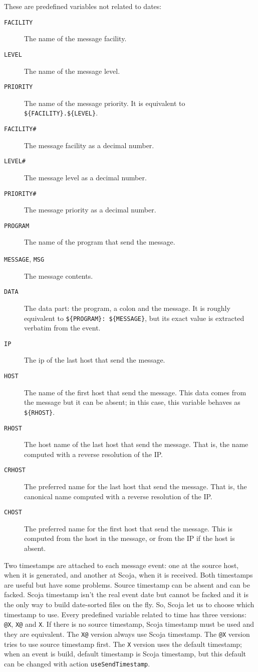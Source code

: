 These are predefined variables not related to dates:
\begin{description}
  \item[{\tt FACILITY}]
    The name of the message facility.
  \item[{\tt LEVEL}]
    The name of the message level.
  \item[{\tt PRIORITY}]
    The name of the message priority.
    It is equivalent to \verb|${FACILITY}.${LEVEL}|.
  \item[{\tt FACILITY\#}]
    The message facility as a decimal number.
  \item[{\tt LEVEL\#}]
    The message level as a decimal number.
  \item[{\tt PRIORITY\#}]
    The message priority as a decimal number.
  
  \item[{\tt PROGRAM}]
    The name of the program that send the message.
  \item[{\tt MESSAGE}, {\tt MSG}]
    The message contents.
  \item[{\tt DATA}]
    The data part: the program, a colon and the message.
    It is roughly equivalent to \verb|${PROGRAM}: ${MESSAGE}|,
    but its exact value is extracted verbatim from the event.
    
  \item[{\tt IP}]
    The ip of the last host that send the message.
  \item[{\tt HOST}]
    The name of the first host that send the message.
    This data comes from the message but it can be absent;
    in this case, this variable behaves as \verb|${RHOST}|.
  \item[{\tt RHOST}]
    The host name of the last host that send the message.
    That is, the name computed with a reverse resolution of the IP.
  \item[{\tt CRHOST}]
    The preferred name for the last host that send the message.
    That is, the canonical name computed with a reverse resolution of the IP.
  \item[{\tt CHOST}]
    The preferred name for the first host that send the message.
    This is computed from the host in the message, or from the IP if
    the host is absent.
\end{description}

Two timestamps are attached to each message event:
one at the source host, when it is generated,
and another at Scoja, when it is received.
Both timestamps are useful but have some problems.
Source timestamp can be absent and can be facked.
Scoja timestamp isn't the real event date but cannot be facked and it
is the only way to build date-sorted files on the fly.
So, Scoja let us to choose which timestamp to use.
Every predefined variable related to time has three versions:
\verb|@X|, \verb|X@| and \verb|X|.
If there is no source timestamp, Scoja timestamp must be used and they
are equivalent.
The \verb|X@| version always use Scoja timestamp.
The \verb|@X| version tries to use source timestamp first.
The \verb|X| version uses the default timestamp;
when an event is build, default timestamp is Scoja timestamp, but this
default can be changed with action {\tt useSendTimestamp}.

